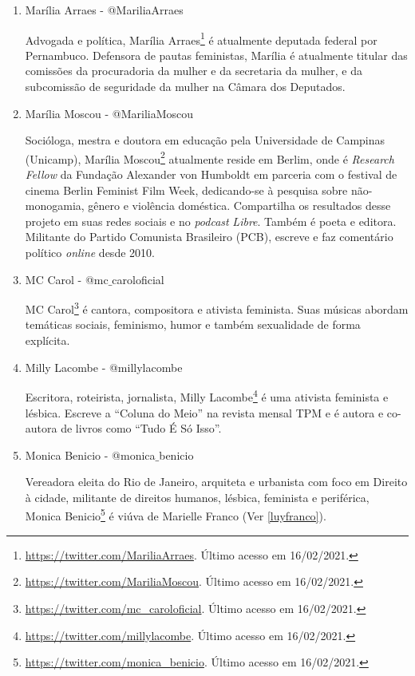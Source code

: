 \documentclass[
	12pt,				%
	openright,			%
	twoside,			%
	a4paper,			%
	english,			%
	brazil				%
	]{abntex2}
\begin{document}
\begin{anexosenv}
\begin{enumerate}
 \item Marília Arraes - @MariliaArraes
 
 Advogada e política, Marília Arraes\footnote{\url{https://twitter.com/MariliaArraes}. Último acesso em 16/02/2021.} é atualmente deputada federal por Pernambuco. Defensora de pautas feministas, Marília é atualmente titular das comissões da procuradoria da mulher e da secretaria da mulher, e da subcomissão de seguridade da mulher na Câmara dos Deputados.

 \item Marília Moscou - @MariliaMoscou
 
 Socióloga, mestra e doutora em educação pela Universidade de Campinas (Unicamp), Marília Moscou\footnote{\url{https://twitter.com/MariliaMoscou}. Último acesso em 16/02/2021.} atualmente reside em Berlim, onde é \textit{Research Fellow} da Fundação Alexander von Humboldt em parceria com o festival de cinema Berlin Feminist Film Week, dedicando-se à pesquisa sobre não-monogamia, gênero e violência doméstica. Compartilha os resultados desse projeto em suas redes sociais e no \textit{podcast} \textit{Libre}. Também é poeta e editora. Militante do Partido Comunista Brasileiro (PCB), escreve e faz comentário político \textit{online} desde 2010.

 \item MC Carol - @mc$\_$caroloficial
 
 MC Carol\footnote{\url{https://twitter.com/mc_caroloficial}. Último acesso em 16/02/2021.} é cantora, compositora e ativista feminista. Suas músicas abordam temáticas sociais, feminismo, humor e também sexualidade de forma explícita.

 \item Milly Lacombe - @millylacombe
 
 Escritora, roteirista, jornalista, Milly Lacombe\footnote{\url{https://twitter.com/millylacombe}. Último acesso em 16/02/2021.} é uma ativista feminista e lésbica. Escreve a ``Coluna do Meio'' na revista mensal TPM e é autora e co-autora de livros como ``Tudo É Só Isso''.

 \item Monica Benicio - @monica$\_$benicio\label{monicabenicio}
 
 Vereadora eleita do Rio de Janeiro, arquiteta e urbanista com foco em Direito à cidade, militante de direitos humanos, lésbica, feminista e periférica, Monica Benicio\footnote{\url{https://twitter.com/monica_benicio}. Último acesso em 16/02/2021.} é viúva de Marielle Franco (Ver \ref{luyfranco}).


\end{enumerate}
\end{anexosenv}
\end{document}
